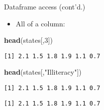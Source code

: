 \documentclass[8pt,ignorenonframetext,]{beamer}
\newenvironment{Shaded}{\begin{snugshade}}{\end{snugshade}}
\newcommand{\KeywordTok}[1]{\textcolor[rgb]{0.13,0.29,0.53}{\textbf{#1}}}
\newcommand{\DecValTok}[1]{\textcolor[rgb]{0.00,0.00,0.81}{#1}}
\newcommand{\StringTok}[1]{\textcolor[rgb]{0.31,0.60,0.02}{#1}}
\newcommand{\OperatorTok}[1]{\textcolor[rgb]{0.81,0.36,0.00}{\textbf{#1}}}
\newcommand{\NormalTok}[1]{#1}
\providecommand{\tightlist}{%
  \setlength{\itemsep}{0pt}\setlength{\parskip}{0pt}}
\begin{document}
\begin{frame}[fragile]{Dataframe access (cont'd.)}

\begin{itemize}
\tightlist
\item
  All of a column:
\end{itemize}

\begin{Shaded}
\begin{Highlighting}[]
\KeywordTok{head}\NormalTok{(states[,}\DecValTok{3}\NormalTok{])}
\end{Highlighting}
\end{Shaded}

\begin{verbatim}
[1] 2.1 1.5 1.8 1.9 1.1 0.7
\end{verbatim}

\begin{Shaded}
\begin{Highlighting}[]
\KeywordTok{head}\NormalTok{(states[,}\StringTok{"Illiteracy"}\NormalTok{])}
\end{Highlighting}
\end{Shaded}

\begin{verbatim}
[1] 2.1 1.5 1.8 1.9 1.1 0.7
\end{verbatim}

\begin{Shaded}
\end{Shaded}

\begin{verbatim}
[1] 2.1 1.5 1.8 1.9 1.1 0.7
\end{verbatim}

\end{frame}
\end{document}

